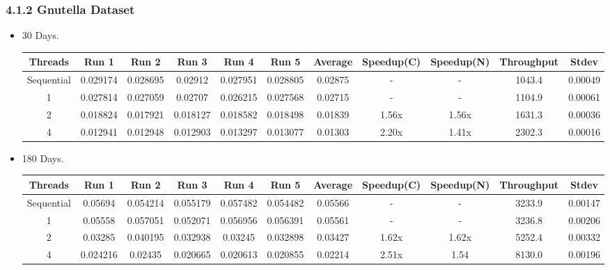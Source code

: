 \documentclass{article}
\begin{document}
\subsubsection*{4.1.2 Gnutella Dataset}
\begin{itemize}
    \item 30 Days.
    \begin{center}
    \begin{adjustbox}{width=\columnwidth,center}
    \begin{tabular}{||c | c c c c c | c | c c | c c ||} 
    \hline
    Threads & Run 1 & Run 2 & Run 3 & Run 4 & Run 5 & Average & Speedup(C) & Speedup(N) & Throughput & Stdev \\ [0.5ex] 
    \hline\hline
    Sequential & 0.029174 & 0.028695 & 0.02912 & 0.027951 & 0.028805 & 0.02875 & - & - & 1043.4  & 0.00049\\ 
    \hline
    1 & 0.027814 & 0.027059 & 0.02707 & 0.026215 & 0.027568 & 0.02715 & - & - & 1104.9 & 0.00061\\ 
    \hline
    2 & 0.018824 & 0.017921 & 0.018127 & 0.018582 & 0.018498 & 0.01839 & 1.56x & 1.56x & 1631.3 & 0.00036\\ 
    \hline
    4 & 0.012941 & 0.012948 & 0.012903 & 0.013297 & 0.013077 & 0.01303 & 2.20x & 1.41x & 2302.3 & 0.00016\\ 
    \hline
    \end{tabular}
    \end{adjustbox}
    \end{center}
    
    \item 180 Days.
   \begin{center}
    \begin{adjustbox}{width=\columnwidth,center}
    \begin{tabular}{||c | c c c c c | c | c c | c c ||} 
    \hline
    Threads & Run 1 & Run 2 & Run 3 & Run 4 & Run 5 & Average & Speedup(C) & Speedup(N) & Throughput & Stdev \\ [0.5ex] 
    \hline\hline
    Sequential & 0.05694 & 0.054214 & 0.055179 & 0.057482 & 0.054482 &0.05566 & - & - & 3233.9 & 0.00147\\ 
    \hline
    1 & 0.05558 & 0.057051 & 0.052071 & 0.056956 & 0.056391 & 0.05561 & - & - & 3236.8 & 0.00206\\ 
    \hline
    2 & 0.03285 & 0.040195 & 0.032938 & 0.03245 & 0.032898 & 0.03427 & 1.62x &  1.62x & 5252.4 & 0.00332\\ 
    \hline
    4 & 0.024216 & 0.02435 & 0.020665 & 0.020613 & 0.020855 & 0.02214 & 2.51x & 1.54 &  8130.0 & 0.00196\\ 
    \hline
    \end{tabular}
    \end{adjustbox}
    \end{center}
    

\end{itemize}
\end{document}
